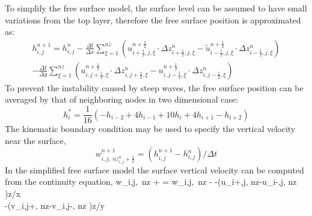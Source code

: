 To simplify the free surface model, the surface level can be assumed to have small variations from the top layer, therefore the free surface position is approximated as:
\begin{eqnarray}
h_{i,j}^{n+1}=h_{i,j}^n - \frac{\Delta t}{\Delta x}
\sum_{\xi=1}^{nz} ( u_{i+ \frac{1}{2},j ,\xi}^{n +
\frac{1}{2}}  \cdot \Delta z_{i+ \frac{1}{2},j,\xi}^n -
\widetilde{u}_{i- \frac{1}{2},j,\xi}^{n + \frac{1}{2}}  \cdot
\Delta z_{i- \frac{1}{2},j , \xi}^n) \nonumber \\
- \frac{\Delta t}{\Delta y}
\sum_{\xi=1}^{nz} ( u_{i,j+ \frac{1}{2},\xi}^{n +
\frac{1}{2}}  \cdot \Delta z_{i,j+ \frac{1}{2},\xi}^n -
u_{i,j- \frac{1}{2},\xi}^{n + \frac{1}{2}}  \cdot
\Delta z_{i,j- \frac{1}{2}, \xi}^n)
\end{eqnarray}
To prevent the instability caused by steep waves, the free surface position can be averaged by that of neighboring nodes in two dimensional case\cite{Turnbull2003}:
\begin{equation}
h_i^*=\frac{1}{16}(-h_{i-2}+4h_{i-1}+10h_{i}+4h_{i+1}-h_{i+2})
\end{equation}
The kinematic boundary condition may be used to specify the vertical
velocity near the surface,
\begin{equation}
w_{i,j,\ nz_{i,j}^n + \frac{1}{2}} ^{n+1} = (h_{i,j}^{n+1}-h_{i,j}^{n})/ \Delta
t
\end{equation}
In the simplified free surface model the surface vertical velocity can be computed from the continuity equation,
\ba
\small
w_{i,j,\ nz + } = w_{i,j,\ nz - }
-(u_{i+,j, nz}-u_{i-,j, nz} )\Delta z/\Delta x \nonumber \\
-(v_{i,j+, nz}-v_{i,j-, nz} )\Delta z/\Delta y
\ea

